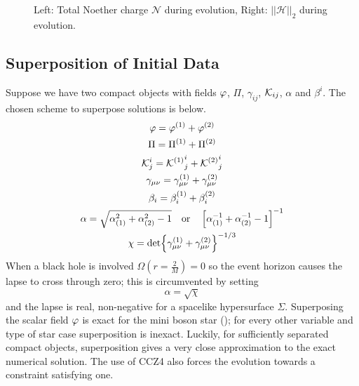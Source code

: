   \begin{figure}[H]
  \caption{Left: Total Noether charge $\mathcal{N}$ during evolution, Right: $|| \mathcal{H} ||_2$ during evolution.}
  \centering
  \hfill
\end{figure}

\subsection{Superposition of Initial Data}
Suppose we have two compact objects with fields $\varphi$, $\Pi$, $\gamma_{ij}$, $\mathcal{K}_{ij}$, $\alpha$ and $\beta^i$. The chosen scheme to superpose solutions is below.
\begin{gather*} \varphi = \varphi^{(1)} + \varphi^{(2)}\\
\Pi = \Pi^{(1)} + \Pi^{(2)}\\
 \mathcal{K}^i_j = {\mathcal{K}^{(1)}}^i_j+{\mathcal{K}^{(2)}}^i_j\\
 \gamma_{\mu\nu} = \gamma^{(1)}_{\mu\nu} + \gamma^{(2)}_{\mu\nu}\\
\beta_i = \beta^{(1)}_i + \beta^{(2)}_i \\
 \alpha = \sqrt{\alpha_{(1)}^2 + \alpha_{(2)}^2-1} \quad \mathrm{or}\quad \left[ \alpha_{(1)}^{-1} +  \alpha_{(2)}^{-1}-1\right]^{-1}\\
 \chi = \det{\gamma^{(1)}_{\mu\nu} + \gamma^{(2)}_{\mu\nu}}^{-1/3}\end{gather*}
When a black hole is involved $\Omega(r=\frac{2}{M})=0$ so the event horizon causes the lapse to cross through zero; this is circumvented by setting
\begin{equation} \alpha = \sqrt{\chi}\end{equation}
and the lapse is real, non-negative for a spacelike hypersurface $\Sigma$. Superposing the scalar field $\varphi$ is exact for the mini boson star (); for every other variable and type of star case superposition is inexact. Luckily, for sufficiently separated compact objects, superposition gives a very close approximation to the exact numerical solution. The use of CCZ4 also forces the evolution towards a constraint satisfying one. 



